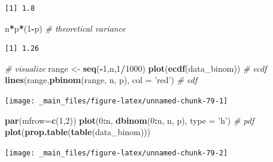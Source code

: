 \documentclass[
]{book}
\newenvironment{Shaded}{\begin{snugshade}}{\end{snugshade}}
\newcommand{\CommentTok}[1]{\textcolor[rgb]{0.56,0.35,0.01}{\textit{#1}}}
\newcommand{\DataTypeTok}[1]{\textcolor[rgb]{0.13,0.29,0.53}{#1}}
\newcommand{\DecValTok}[1]{\textcolor[rgb]{0.00,0.00,0.81}{#1}}
\newcommand{\KeywordTok}[1]{\textcolor[rgb]{0.13,0.29,0.53}{\textbf{#1}}}
\newcommand{\NormalTok}[1]{#1}
\newcommand{\OperatorTok}[1]{\textcolor[rgb]{0.81,0.36,0.00}{\textbf{#1}}}
\newcommand{\StringTok}[1]{\textcolor[rgb]{0.31,0.60,0.02}{#1}}
\begin{document}
\begin{verbatim}
[1] 1.8
\end{verbatim}

\begin{Shaded}
\begin{Highlighting}[]
\NormalTok{n}\OperatorTok{*}\NormalTok{p}\OperatorTok{*}\NormalTok{(}\DecValTok{1}\OperatorTok{-}\NormalTok{p)	    }\CommentTok{# theoretical variance}
\end{Highlighting}
\end{Shaded}

\begin{verbatim}
[1] 1.26
\end{verbatim}

\begin{Shaded}
\begin{Highlighting}[]
\CommentTok{# visualize}
\NormalTok{range <-}\StringTok{ }\KeywordTok{seq}\NormalTok{(}\OperatorTok{-}\DecValTok{1}\NormalTok{,n,}\DecValTok{1}\OperatorTok{/}\DecValTok{1000}\NormalTok{)}
\KeywordTok{plot}\NormalTok{(}\KeywordTok{ecdf}\NormalTok{(data_binom))   }\CommentTok{# ecdf}
\KeywordTok{lines}\NormalTok{(range,}\KeywordTok{pbinom}\NormalTok{(range, n, p), }\DataTypeTok{col =} \StringTok{'red'}\NormalTok{) }\CommentTok{# cdf}
\end{Highlighting}
\end{Shaded}

\begin{center}\texttt{[image: \_main\_files/figure-latex/unnamed-chunk-79-1]} \end{center}

\begin{Shaded}
\begin{Highlighting}[]
\KeywordTok{par}\NormalTok{(}\DataTypeTok{mfrow=}\KeywordTok{c}\NormalTok{(}\DecValTok{1}\NormalTok{,}\DecValTok{2}\NormalTok{))}
\KeywordTok{plot}\NormalTok{(}\DecValTok{0}\OperatorTok{:}\NormalTok{n, }\KeywordTok{dbinom}\NormalTok{(}\DecValTok{0}\OperatorTok{:}\NormalTok{n, n, p), }\DataTypeTok{type =} \StringTok{'h'}\NormalTok{) }\CommentTok{# pdf}
\KeywordTok{plot}\NormalTok{(}\KeywordTok{prop.table}\NormalTok{(}\KeywordTok{table}\NormalTok{(data_binom)))}
\end{Highlighting}
\end{Shaded}

\begin{center}\texttt{[image: \_main\_files/figure-latex/unnamed-chunk-79-2]} \end{center}
\end{document}
